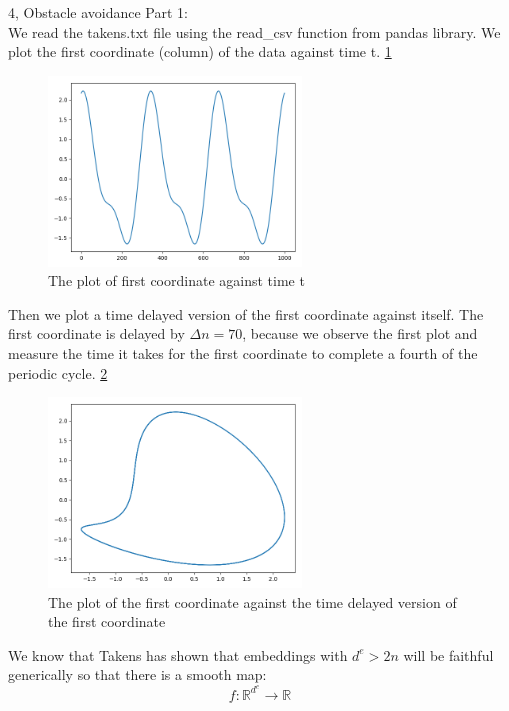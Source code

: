 \documentclass[10pt,a4paper]{article}
\begin{document}
\begin{task}{4, Obstacle avoidance}
Part 1: \\
We read the takens.txt file using the read\_csv function from pandas library. We plot the first coordinate (column) of the data against time t. \ref{fig:task4_part1_1}

\begin{figure}[H]
\centering
\includegraphics[width=0.6\textwidth]{../plots/task4_part1_1.png}
\caption{The plot of first coordinate against time t}
\label{fig:task4_part1_1}
\end{figure}

Then we plot a time delayed version of the first coordinate against itself. The first coordinate is delayed by $\Delta n = 70$, because we observe the first plot and measure the time it takes for the first coordinate to complete a fourth of the periodic cycle. \ref{fig:task4_part1_2}

\begin{figure}[H]
\centering
\includegraphics[width=0.6\textwidth]{../plots/task4_part1_2.png}
\caption{The plot of the first coordinate against the time delayed version of the first coordinate}
\label{fig:task4_part1_2}
\end{figure}

We know that Takens has shown that embeddings with $d^{e} > 2n$ will be faithful generically so that there is a smooth map:
\begin{equation*}
f : \mathbb{R}^{d^{e}} \rightarrow \mathbb{R}
\end{equation*}


\end{task}
\end{document}
